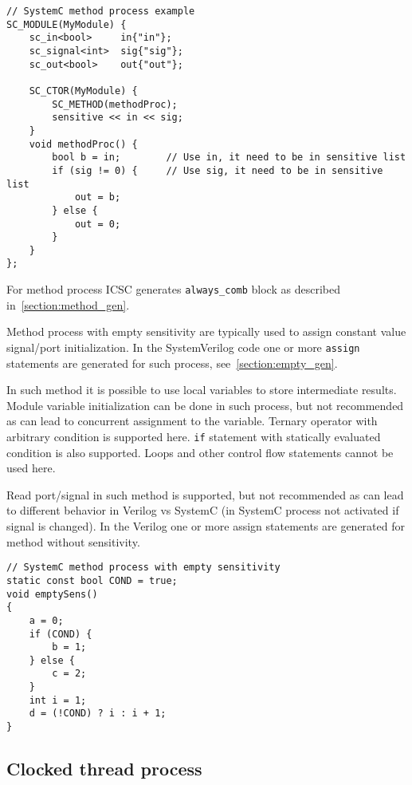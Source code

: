\begin{lstlisting}[style=mycpp]
// SystemC method process example
SC_MODULE(MyModule) {
    sc_in<bool>     in{"in"};
    sc_signal<int>  sig{"sig"};
    sc_out<bool>    out{"out"};
    
    SC_CTOR(MyModule) {
        SC_METHOD(methodProc);
        sensitive << in << sig;
    }    
    void methodProc() {
    	bool b = in;        // Use in, it need to be in sensitive list
        if (sig != 0) {     // Use sig, it need to be in sensitive list
    	    out = b;
        } else {
            out = 0;
        }
    }
};
\end{lstlisting}
%
For method process ICSC generates {\tt always\_comb} block as described in~\ref{section:method_gen}.

Method process with empty sensitivity are typically used to assign constant value signal/port initialization. In the SystemVerilog code one or more {\tt assign} statements are generated for such process, see~\ref{section:empty_gen}. 

In such method it is possible to use local variables to store intermediate results. Module variable initialization can be done in such process, but not recommended as can lead to concurrent assignment to the variable. Ternary operator with arbitrary condition is supported here. {\tt if} statement with statically evaluated condition is also supported. Loops and other control flow statements cannot be used here.

Read port/signal in such method is supported, but not recommended as can lead to different behavior in Verilog vs SystemC (in SystemC process not activated if signal is changed). In the Verilog one or more assign statements are generated for method without sensitivity. 

\begin{lstlisting}[style=mycpp]
// SystemC method process with empty sensitivity
static const bool COND = true;
void emptySens()
{
    a = 0;
    if (COND) {
        b = 1;
    } else {
        c = 2;
    }
    int i = 1;
    d = (!COND) ? i : i + 1; 
}
\end{lstlisting}


\subsection{Clocked thread process}

